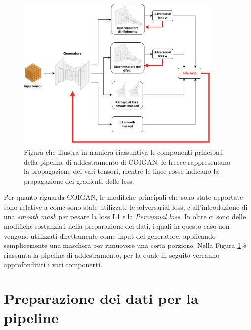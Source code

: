    \begin{figure}[H]
        \centering
        \includegraphics[width=0.9\textwidth]{imgs/Coigan/General pipeline schema.png}
        \caption{Figura che illustra in maniera riassuntiva le componenti principali della pipeline di addestramento di COIGAN.
        le frecce rappresentano la propagazione dei vari tensori, mentre le linee rosse indicano la propagazione dei gradienti delle loss.} 
        \label{fig:pipeline_di_addestramento}
    \end{figure}

Per quanto riguarda COIGAN, le modifiche principali che sono state apportate sono relative a come sono state utilizzate le adversarial loss, e all'introduzione
di una \textit{smooth mask} per pesare la loss L1 e la \textit{Perceptual loss}. In oltre ci sono delle modifiche sostanziali nella preparazione dei dati,
i quali in questo caso non vengono utilizzati direttamente come input del generatore, applicando semplicemente una maschera per rimuovere una certa porzione.
Nella Figura \ref{fig:pipeline_di_addestramento} è riassunta la pipeline di addestramento, per la quale in seguito verranno approfondititi i vari componenti.\\

\section{Preparazione dei dati per la pipeline}

